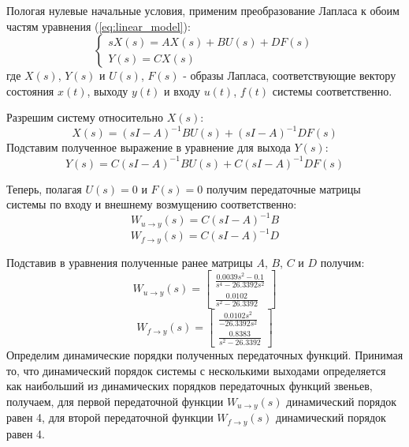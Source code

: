 Пологая нулевые начальные условия, применим преобразование Лапласа к обоим частям уравнения (\ref{eq:linear_model}): 
\begin{equation}
    \begin{cases}
        sX(s) = AX(s) + BU(s) + DF(s) \\ 
        Y(s) = CX(s)
    \end{cases}
\end{equation}
где $X(s)$, $Y(s)$ и $U(s)$, $F(s)$ - образы Лапласа, соответствующие вектору состояния $x(t)$, выходу $y(t)$ и входу $u(t)$, $f(t)$ системы соответственно.

Разрешим систему относительно $X(s)$:
\begin{equation}
    X(s) = (sI - A)^{-1}BU(s) + (sI - A)^{-1}DF(s)
\end{equation}
Подставим полученное выражение в уравнение для выхода $Y(s)$:
\begin{equation}
    Y(s) = C(sI - A)^{-1}BU(s) + C(sI - A)^{-1}DF(s)
\end{equation}

Теперь, полагая $U(s) = 0$ и $F(s) = 0$ получим передаточные матрицы системы по входу и внешнему возмущению соответственно:
\begin{equation}
    W_{u\rightarrow y}(s) = C(sI - A)^{-1}B
\end{equation}
\begin{equation}
    W_{f\rightarrow y}(s) = C(sI - A)^{-1}D
\end{equation}

Подставив в уравнения полученные ранее матрицы $A$, $B$, $C$ и $D$ получим: 
\begin{equation}
    W_{u \rightarrow y}(s) = \begin{bmatrix}
    \frac{0.0039s^2 - 0.1}{s^4 - 26.3392s^2} \\ 
    \frac{0.0102}{s^2 - 26.3392}
    \end{bmatrix}
\end{equation}
\begin{equation}
    W_{f \rightarrow y}(s) = \begin{bmatrix}
    \frac{0.0102s^2}{-26.3392s^2} \\ 
    \frac{0.8383}{s^2 - 26.3392}
    \end{bmatrix}
\end{equation}
Определим динамические порядки полученных передаточных функций. 
Принимая то, что динамический порядок системы с несколькими выходами определяется как 
наибольший из динамических порядков передаточных функций звеньев, получаем, 
для первой передаточной функции $W_{u \rightarrow y}(s)$ динамический порядок равен 4, 
для второй передаточной функции $W_{f \rightarrow y}(s)$ динамический порядок равен 4. 

